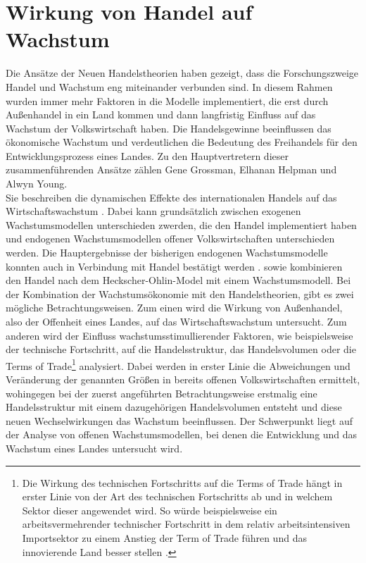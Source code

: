 \section{Wirkung von Handel auf Wachstum}\label{WirkungHandel}
Die Ansätze der Neuen Handelstheorien haben gezeigt, dass die Forschungszweige Handel und Wachstum eng miteinander verbunden sind. In diesem Rahmen wurden immer mehr Faktoren in die Modelle implementiert, die erst durch Außenhandel in ein Land kommen und dann langfristig Einfluss auf das Wachstum der Volkswirtschaft haben. Die Handelsgewinne beeinflussen das ökonomische Wachstum und verdeutlichen die Bedeutung des Freihandels für den Entwicklungsprozess eines Landes. Zu den Hauptvertretern dieser zusammenführenden Ansätze zählen Gene Grossman, Elhanan Helpman und Alwyn Young.\\
%
Sie beschreiben die dynamischen Effekte des internationalen Handels auf das Wirtschaftswachstum \cite{Young.1991,Grossman.1995}. Dabei kann grundsätzlich zwischen exogenen Wachstumsmodellen unterschieden zwerden, die den Handel implementiert haben \cite{Dixit.1980,Ethier.1982, Krugman.1979ab,Krugman.1981,Lancaster.1980} und endogenen Wachstumsmodellen offener Volkswirtschaften \cite{Dinopoulos.,Feenstra.,Grossman.1989a,Grossman1989b.,Grossman.1990d,Grossman.1991c, Krugman.1990,Segerstrom.1990,Young.1991,Backus.} unterschieden werden. Die Hauptergebnisse der bisherigen endogenen Wachstumsmodelle konnten auch in Verbindung mit Handel bestätigt werden \cite{vanLong.1997}. 
%
\cite{Atkeson.2000} sowie \cite{Cunat.2001} kombinieren den Handel nach dem Heckscher-Ohlin-Model mit einem Wachstumsmodell. 
%
Bei der Kombination der Wachstumsökonomie mit den Handelstheorien, gibt es zwei mögliche Betrachtungsweisen. Zum einen wird die Wirkung von Außenhandel, also der Offenheit eines Landes, auf das Wirtschaftswachstum untersucht. Zum anderen wird der Einfluss wachstumsstimullierender Faktoren, wie beispielsweise der technische Fortschritt, auf die Handelsstruktur, das Handelsvolumen oder die Terms of Trade\footnote{Die Wirkung des technischen Fortschritts auf die Terms of Trade hängt in erster Linie von der Art des technischen Fortschritts ab und in welchem Sektor dieser angewendet wird. So würde beispielsweise ein arbeitsvermehrender technischer Fortschritt in dem relativ arbeitsintensiven Importsektor zu einem Anstieg der Term of Trade führen und das innovierende Land besser stellen \cite{Gandolfo.1998}.} analysiert. Dabei werden in erster Linie die Abweichungen und Veränderung der genannten Größen in bereits offenen Volkswirtschaften ermittelt, wohingegen bei der zuerst angeführten Betrachtungsweise erstmalig eine Handelsstruktur mit einem dazugehörigen Handelsvolumen entsteht und diese neuen Wechselwirkungen das Wachstum beeinflussen. Der Schwerpunkt liegt auf der Analyse von offenen Wachstumsmodellen, bei denen die Entwicklung und das Wachstum eines Landes untersucht wird.
%
